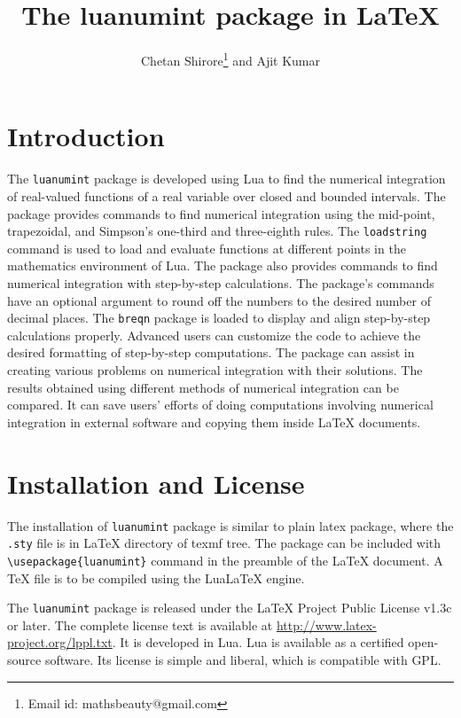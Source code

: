 \documentclass{article}
\begin{document}
\title{The luanumint package in LaTeX}
\author{Chetan Shirore\thanks{Email id: mathsbeauty@gmail.com} \space and  Ajit Kumar}
\maketitle

\section{Introduction} 
The \verb|luanumint| package is developed using Lua to find the numerical integration of real-valued functions of a real variable over closed and bounded intervals. The package provides commands to find numerical integration using the mid-point, trapezoidal, and Simpson's one-third and three-eighth rules. The \verb|loadstring| command is used to load and evaluate functions at different points in the mathematics environment of Lua. The package also provides commands to find numerical integration with step-by-step calculations. The package's commands have an optional argument to round off the numbers to the desired number of decimal places. The \verb|breqn| package is loaded to display and align step-by-step calculations properly. Advanced users can customize the code to achieve the desired formatting of step-by-step computations. The package can assist in creating various problems on numerical integration with their solutions. The results obtained using different methods of numerical integration can be compared. It can save users' efforts of doing computations involving numerical integration in external software and copying them inside LaTeX documents.

\section{Installation and License}
The installation of \verb|luanumint| package is similar to plain latex package, where the \texttt{.sty} file is in LaTeX directory of texmf tree. The package can be included with \verb|\usepackage{luanumint}| command in the preamble of the LaTeX document. A TeX file is to be compiled using the LuaLaTeX engine.

The \verb|luanumint| package is released under the LaTeX Project Public License v1.3c or later. The complete license text is available at \url{http://www.latex-project.org/lppl.txt}. It is developed in Lua.  Lua is available as a certified open-source software. Its license is simple and liberal, which is compatible with GPL.
\end{document}
